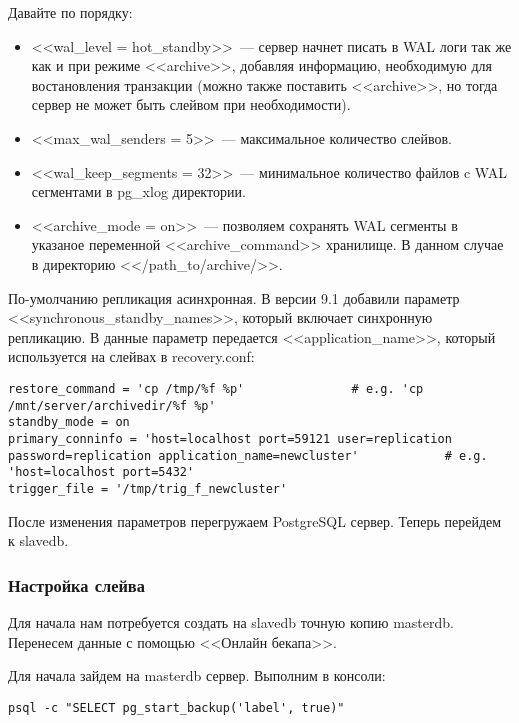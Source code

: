 Давайте по порядку:
\begin{itemize}
\item <<wal\_level = hot\_standby>>~--- сервер начнет писать в WAL логи так же как и при режиме <<archive>>, 
добавляя информацию, необходимую для востановления транзакции (можно также поставить <<archive>>, 
но тогда сервер не может быть слейвом при необходимости).
\item <<max\_wal\_senders = 5>>~--- максимальное количество слейвов.
\item <<wal\_keep\_segments = 32>>~--- минимальное количество файлов c WAL сегментами в pg\_xlog директории.
\item <<archive\_mode = on>>~--- позволяем сохранять WAL сегменты в указаное переменной <<archive\_command>> хранилище. 
В данном случае в директорию <</path\_to/archive/>>.
\end{itemize}

По-умолчанию репликация асинхронная. В версии 9.1 добавили параметр <<synchronous\_standby\_names>>, который включает синхронную репликацию. В данные параметр передается <<application\_name>>, который используется на слейвах в recovery.conf:

\begin{lstlisting}[label=lst:streaming91,caption=recovery.conf для синхронной репликации на слейве]
restore_command = 'cp /tmp/%f %p'               # e.g. 'cp /mnt/server/archivedir/%f %p'
standby_mode = on
primary_conninfo = 'host=localhost port=59121 user=replication password=replication application_name=newcluster'            # e.g. 'host=localhost port=5432'
trigger_file = '/tmp/trig_f_newcluster'
\end{lstlisting}


После изменения параметров перегружаем PostgreSQL сервер. Теперь перейдем к slavedb.

\subsubsection{Настройка слейва}
Для начала нам потребуется создать на slavedb точную копию masterdb. Перенесем данные с помощью <<Онлайн бекапа>>.

Для начала зайдем на masterdb сервер. Выполним в консоли:
\begin{lstlisting}[label=lst:streaming10,caption=Выполняем на мастере]
psql -c "SELECT pg_start_backup('label', true)" 
\end{lstlisting}


